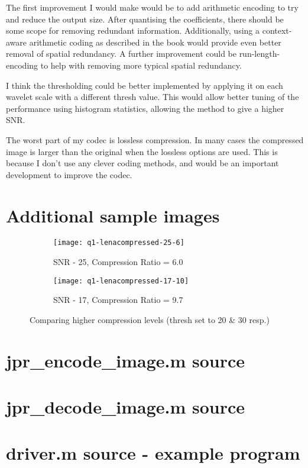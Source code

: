\documentclass[a4paper]{article}
\begin{document}
The first improvement I would make would be to add arithmetic encoding to try and reduce the output size. After quantising the coefficients, there should be some scope for removing redundant information. Additionally, using a context-aware arithmetic coding as described in the book would provide even better removal of spatial redundancy. A further improvement could be run-length-encoding to help with removing  more typical spatial redundancy.

I think the thresholding could be better implemented by applying it on each wavelet scale with a different thresh value. This would allow better tuning of the performance using histogram statistics, allowing the method to give a higher SNR. 

The worst part of my codec is lossless compression. In many cases the compressed image is larger than the original when the lossless options are used. This is because I don't use any clever coding methods, and would be an important development to improve the codec.

\clearpage
 \appendix 
 \section{Additional sample images}
\begin{figure}[h]
     
         \centering
         \begin{subfigure}[b]{0.25\textwidth}
                 \centering
                 \texttt{[image: q1-lenacompressed-25-6]}
                 \caption{SNR - 25, Compression Ratio = 6.0}
                 \label{fig3lena:1}
         \end{subfigure}
         \begin{subfigure}[b]{0.25\textwidth}
                 \centering
                 \texttt{[image: q1-lenacompressed-17-10]}
                 \caption{SNR - 17, Compression Ratio = 9.7}
                 \label{fig3lena:2}
        \end{subfigure} 

        \caption{Comparing higher compression levels (thresh set to 20 \& 30 resp.)}        
        \label{fig3}
 \end{figure} 
\section{jpr\_encode\_image.m source}
\label{appendix-lst1} 

\section{jpr\_decode\_image.m source}
\label{appendix-lst2} 

\section{driver.m source - example program}
\label{appendix-lst3} 

\end{document}
